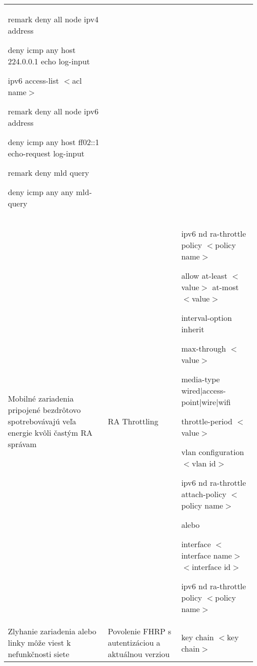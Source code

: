 \begin{longtable}[!htbp]{|L{10em}L{10em}>{\selectfont}L{34em}|}
	\hspace{0.5em}remark deny all node ipv4 address
	
	\hspace{0.5em}deny icmp any host 224.0.0.1 echo log-input
	
	
	ipv6 access-list $<$acl name$>$
	
	\hspace{0.5em}remark deny all node ipv6 address
	
	\hspace{0.5em}deny icmp any host ff02::1 echo-request log-input
	
	\hspace{0.5em}remark deny mld query
	
	\hspace{0.5em}deny icmp any any mld-query\\
	
	
	
	
	Mobilné zariadenia pripojené bezdrôtovo spotrebovávajú veľa energie kvôli častým RA správam	&RA Throttling	&ipv6 nd ra-throttle policy $<$policy name$>$
	
	\hspace{0.5em}allow at-least $<$value$>$ at-most $<$value$>$
	
	\hspace{0.5em}interval-option inherit
	
	\hspace{0.5em}max-through $<$value$>$
	
	\hspace{0.5em}media-type wired|access-point|wire|wifi
	
	\hspace{0.5em}throttle-period $<$value$>$
	
	vlan configuration $<$vlan id$>$
	
	\hspace{0.5em}ipv6 nd ra-throttle attach-policy $<$policy name$>$
	
	\vspace{0.5em}
	{\selectfont alebo }
	\vspace{0.5em}
	
	interface $<$interface name$>$ $<$interface id$>$
	
	\hspace{0.5em}ipv6 nd ra-throttle policy $<$policy name$>$\\
	
	
	
	
	Zlyhanie zariadenia alebo linky môže viest k nefunkčnosti siete 	&Povolenie FHRP s autentizáciou a aktuálnou verziou	&key chain $<$key chain$>$
	

\end{longtable}
